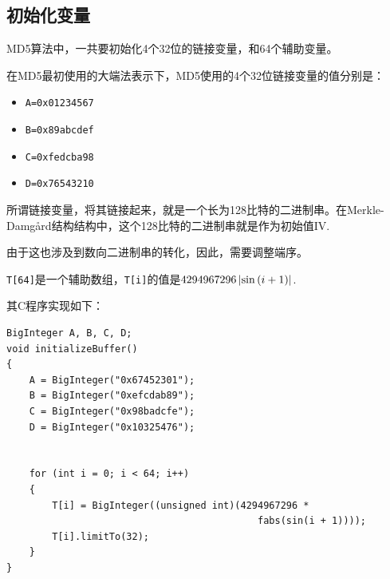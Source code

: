 \subsection{初始化变量}
MD5算法中，一共要初始化4个32位的链接变量，和64个辅助变量。\par
在MD5最初使用的大端法表示下，MD5使用的4个32位链接变量的值分别是：
\begin{itemize}
	\item \verb`A=0x01234567`
	\item \verb`B=0x89abcdef`
	\item \verb`C=0xfedcba98`
	\item \verb`D=0x76543210`
\end{itemize}

所谓链接变量，将其链接起来，就是一个长为128比特的二进制串。在Merkle-Damg\aa rd结构结构中，这个128比特的二进制串就是作为初始值$\mathrm{IV}$.\par
由于这也涉及到数向二进制串的转化，因此，需要调整端序。\par
\verb`T[64]`是一个辅助数组，\verb`T[i]`的值是$4294967296\left| \sin\left( {i+1}\right) \right|$.\par
其C程序实现如下：
\begin{prove}
\begin{verbatim}
BigInteger A, B, C, D;
void initializeBuffer()
{
    A = BigInteger("0x67452301");
    B = BigInteger("0xefcdab89");
    C = BigInteger("0x98badcfe");
    D = BigInteger("0x10325476");


    for (int i = 0; i < 64; i++)
    {
        T[i] = BigInteger((unsigned int)(4294967296 * 
                                            fabs(sin(i + 1))));
        T[i].limitTo(32);
    }
}
\end{verbatim}
\end{prove}
